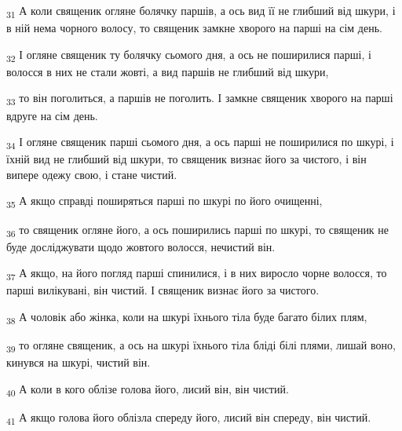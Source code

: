 \begin{tcolorbox}
\textsubscript{31} А коли священик огляне болячку паршів, а ось вид її не глибший від шкури, і в ній нема чорного волосу, то священик замкне хворого на парші на сім день.
\end{tcolorbox}
\begin{tcolorbox}
\textsubscript{32} І огляне священик ту болячку сьомого дня, а ось не поширилися парші, і волосся в них не стали жовті, а вид паршів не глибший від шкури,
\end{tcolorbox}
\begin{tcolorbox}
\textsubscript{33} то він поголиться, а паршів не поголить. І замкне священик хворого на парші вдруге на сім день.
\end{tcolorbox}
\begin{tcolorbox}
\textsubscript{34} І огляне священик парші сьомого дня, а ось парші не поширилися по шкурі, і їхній вид не глибший від шкури, то священик визнає його за чистого, і він випере одежу свою, і стане чистий.
\end{tcolorbox}
\begin{tcolorbox}
\textsubscript{35} А якщо справді поширяться парші по шкурі по його очищенні,
\end{tcolorbox}
\begin{tcolorbox}
\textsubscript{36} то священик огляне його, а ось поширились парші по шкурі, то священик не буде досліджувати щодо жовтого волосся, нечистий він.
\end{tcolorbox}
\begin{tcolorbox}
\textsubscript{37} А якщо, на його погляд парші спинилися, і в них виросло чорне волосся, то парші вилікувані, він чистий. І священик визнає його за чистого.
\end{tcolorbox}
\begin{tcolorbox}
\textsubscript{38} А чоловік або жінка, коли на шкурі їхнього тіла буде багато білих плям,
\end{tcolorbox}
\begin{tcolorbox}
\textsubscript{39} то огляне священик, а ось на шкурі їхнього тіла бліді білі плями, лишай воно, кинувся на шкурі, чистий він.
\end{tcolorbox}
\begin{tcolorbox}
\textsubscript{40} А коли в кого облізе голова його, лисий він, він чистий.
\end{tcolorbox}
\begin{tcolorbox}
\textsubscript{41} А якщо голова його облізла спереду його, лисий він спереду, він чистий.
\end{tcolorbox}
